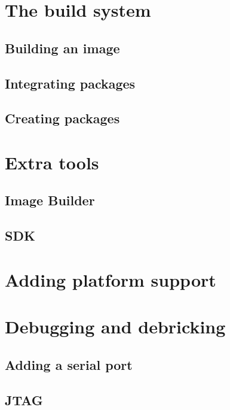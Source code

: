 \documentclass[a4paper]{book}
\begin{document}
\section{The build system}
\subsection{Building an image}
\subsection{Integrating packages}
\subsection{Creating packages}

\section{Extra tools}
\subsection{Image Builder}
\subsection{SDK}

\section{Adding platform support}
\section{Debugging and debricking}
\subsection{Adding a serial port}
\subsection{JTAG}
\end{document}
